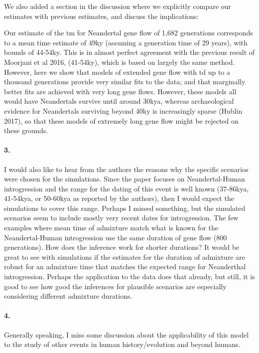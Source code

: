 \documentclass[11pt]{article}
\let\oldparagraph\paragraph
\renewcommand{\paragraph}[1]{\oldparagraph{#1}\mbox{}}
\begin{document}
We also added a section in the discussion where we explicitly compare our estimates with previous estimates, and discuss the implications:

\begin{mdframed}[hidealllines=true,backgroundcolor=grey!20]
Our estimate of the tm for Neandertal gene flow of 1,682 generations corresponds to a mean time estimate of 49ky (assuming a generation time of 29 years), with bounds of 44-54ky. This is in almost perfect agreement with the previous result of Moorjani et al 2016, (41-54ky), which is based on largely the same method. However, here we show that models of extended gene flow with td up to a thousand generations provide very similar fits to the data; and that marginally better fits are achieved with very long gene flows. However, these models all would have Neandertals survive until around 30kya, whereas archaeological evidence for Neandertals surviving beyond 40ky is increasingly sparse (Hublin 2017), so that these models of extremely long gene flow might be rejected on these grounds. 
\end{mdframed}

\paragraph{3.}
I would also like to hear from the authors the reasons why the specific scenarios were chosen for the simulations. Since the paper focuses on Neandertal-Human introgression and the range for the dating of this event is well known (37-86kya, 41-54kya, or 50-60kya as reported by the authors), then I would expect the simulations to cover this range. Perhaps I missed something, but the simulated scenarios seem to include mostly very recent dates for introgression. The few examples where mean time of admixture match what is known for the Neandertal-Human introgression use the same duration of gene flow (800 generations). How does the inference work for shorter durations? It would be great to see with simulations if the estimates for the duration of admixture are robust for an admixture time that matches the expected range for Neanderthal introgression. Perhaps the application to the data does that already, but still, it is good to see how good the inferences for plausible scenarios are especially considering different admixture durations.

\paragraph{4.}
Generally speaking, I miss some discussion about the applicability of this model to the study of other events in human history/evolution and beyond humans.
\end{document}
